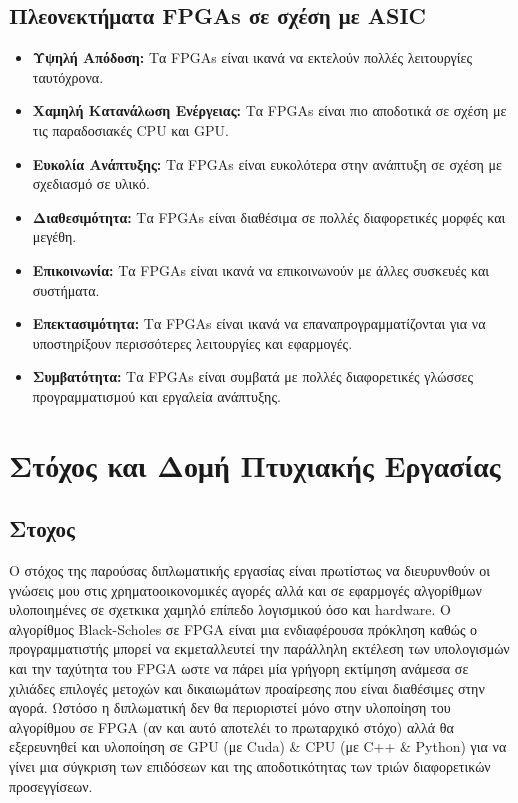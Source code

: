 \subsection{Πλεονεκτήματα FPGAs σε σχέση με ASIC}

\begin{itemize}
    \item \textbf{Υψηλή Απόδοση:} Τα FPGAs είναι ικανά να εκτελούν πολλές λειτουργίες ταυτόχρονα.
    \item \textbf{Χαμηλή Κατανάλωση Ενέργειας:} Τα FPGAs είναι πιο αποδοτικά σε σχέση με τις παραδοσιακές CPU και GPU.
    \item \textbf{Ευκολία Ανάπτυξης:} Τα FPGAs είναι ευκολότερα στην ανάπτυξη σε σχέση με σχεδιασμό σε υλικό.
    \item \textbf{Διαθεσιμότητα:} Τα FPGAs είναι διαθέσιμα σε πολλές διαφορετικές μορφές και μεγέθη.
    \item \textbf{Επικοινωνία:} Τα FPGAs είναι ικανά να επικοινωνούν με άλλες συσκευές και συστήματα.
    \item \textbf{Επεκτασιμότητα:} Τα FPGAs είναι ικανά να επαναπρογραμματίζονται για να υποστηρίξουν περισσότερες λειτουργίες και εφαρμογές.
    \item \textbf{Συμβατότητα:} Τα FPGAs είναι συμβατά με πολλές διαφορετικές γλώσσες προγραμματισμού και εργαλεία ανάπτυξης.
\end{itemize}

\section{Στόχος και Δομή Πτυχιακής Εργασίας}
\label{sec:goal}
\subsection{Στοχος}
Ο στόχος της παρούσας διπλωματικής εργασίας είναι πρωτίστως να διευρυνθούν οι γνώσεις μου στις χρηματοοικονομικές αγορές αλλά και 
σε εφαρμογές αλγορίθμων υλοποιημένες σε σχετκικα χαμηλό επίπεδο λογισμικού όσο και hardware.
Ο αλγορίθμος Black-Scholes σε FPGA είναι μια ενδιαφέρουσα πρόκληση καθώς ο προγραμματιστής μπορεί να εκμεταλλευτεί την παράλληλη 
εκτέλεση των υπολογισμών και την ταχύτητα του FPGA ωστε να πάρει μία γρήγορη εκτίμηση ανάμεσα σε χιλιάδες επιλογές μετοχών και δικαιωμάτων προαίρεσης
που είναι διαθέσιμες στην αγορά. Ωστόσο η διπλωματική δεν θα περιοριστεί μόνο στην υλοποίηση του αλγορίθμου σε FPGA (αν και αυτό αποτελέι το πρωταρχικό στόχο)
αλλά θα εξερευνηθεί και υλοποίηση σε GPU (με Cuda) & CPU (με C++ & Python) για να γίνει μια σύγκριση των επιδόσεων και της αποδοτικότητας των τριών διαφορετικών προσεγγίσεων.

